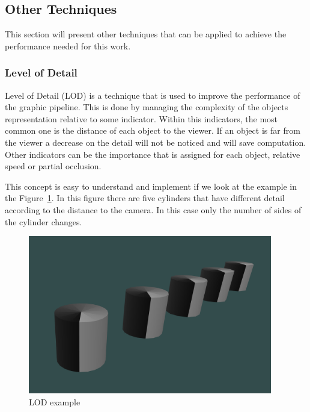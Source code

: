 

\subsection{Other Techniques} %
\label{sub:other_techniques}

This section will present other techniques that can be applied to achieve the performance needed for this work.

\subsubsection{Level of Detail} %
\label{ssub:level_of_detail}

Level of Detail (LOD) is a technique that is used to improve the performance of the graphic pipeline. This is done by managing the complexity of the objects representation relative to some indicator.
Within this indicators, the most common one is the distance of each object to the viewer. If an object is far from the viewer a decrease on the detail will not be noticed and will save computation. Other indicators can be the importance that is assigned for each object, relative speed or partial occlusion.

This concept is easy to understand and implement if we look at the example in the Figure~\ref{fig:LOD2}. In this figure there are five cylinders that have different detail according to the distance to the camera. In this case only the number of sides of the cylinder changes.

\begin{figure}[htbp]
	\centering
	\includegraphics[width=0.95\textwidth]{img/OpenGL/LOD2.png}
	\caption{LOD example}
	\label{fig:LOD2}
\end{figure}

